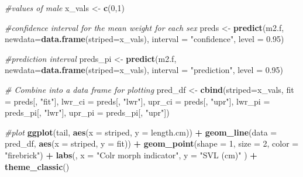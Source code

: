 \documentclass[
]{book}
\newenvironment{Shaded}{\begin{snugshade}}{\end{snugshade}}
\newcommand{\AttributeTok}[1]{\textcolor[rgb]{0.13,0.29,0.53}{#1}}
\newcommand{\CommentTok}[1]{\textcolor[rgb]{0.56,0.35,0.01}{\textit{#1}}}
\newcommand{\DecValTok}[1]{\textcolor[rgb]{0.00,0.00,0.81}{#1}}
\newcommand{\FloatTok}[1]{\textcolor[rgb]{0.00,0.00,0.81}{#1}}
\newcommand{\FunctionTok}[1]{\textcolor[rgb]{0.13,0.29,0.53}{\textbf{#1}}}
\newcommand{\NormalTok}[1]{#1}
\newcommand{\OtherTok}[1]{\textcolor[rgb]{0.56,0.35,0.01}{#1}}
\newcommand{\SpecialCharTok}[1]{\textcolor[rgb]{0.81,0.36,0.00}{\textbf{#1}}}
\newcommand{\StringTok}[1]{\textcolor[rgb]{0.31,0.60,0.02}{#1}}
\begin{document}
\begin{Shaded}
\begin{Highlighting}[]
\CommentTok{\#values of male}
\NormalTok{x\_vals }\OtherTok{\textless{}{-}} \FunctionTok{c}\NormalTok{(}\DecValTok{0}\NormalTok{,}\DecValTok{1}\NormalTok{)}

\CommentTok{\#confidence interval for the mean weight for each sex}
\NormalTok{preds }\OtherTok{\textless{}{-}} \FunctionTok{predict}\NormalTok{(m2.f, }\AttributeTok{newdata=}\FunctionTok{data.frame}\NormalTok{(}\AttributeTok{striped=}\NormalTok{x\_vals), }
                 \AttributeTok{interval =} \StringTok{"confidence"}\NormalTok{, }\AttributeTok{level =} \FloatTok{0.95}\NormalTok{)}

\CommentTok{\#prediction interval}
\NormalTok{preds\_pi }\OtherTok{\textless{}{-}} \FunctionTok{predict}\NormalTok{(m2.f, }\AttributeTok{newdata=}\FunctionTok{data.frame}\NormalTok{(}\AttributeTok{striped=}\NormalTok{x\_vals), }
                    \AttributeTok{interval =} \StringTok{"prediction"}\NormalTok{, }\AttributeTok{level =} \FloatTok{0.95}\NormalTok{)}

\CommentTok{\# Combine into a data frame for plotting}
\NormalTok{pred\_df }\OtherTok{\textless{}{-}} \FunctionTok{cbind}\NormalTok{(}\AttributeTok{striped=}\NormalTok{x\_vals,}
                 \AttributeTok{fit =}\NormalTok{ preds[, }\StringTok{"fit"}\NormalTok{],}
                 \AttributeTok{lwr\_ci =}\NormalTok{ preds[, }\StringTok{"lwr"}\NormalTok{],}
                 \AttributeTok{upr\_ci =}\NormalTok{ preds[, }\StringTok{"upr"}\NormalTok{],}
                 \AttributeTok{lwr\_pi =}\NormalTok{ preds\_pi[, }\StringTok{"lwr"}\NormalTok{],}
                 \AttributeTok{upr\_pi =}\NormalTok{ preds\_pi[, }\StringTok{"upr"}\NormalTok{])}

\CommentTok{\#plot}
\FunctionTok{ggplot}\NormalTok{(tail, }\FunctionTok{aes}\NormalTok{(}\AttributeTok{x =}\NormalTok{ striped, }\AttributeTok{y =}\NormalTok{ length.cm)) }\SpecialCharTok{+}
  \FunctionTok{geom\_line}\NormalTok{(}\AttributeTok{data =}\NormalTok{ pred\_df, }
              \FunctionTok{aes}\NormalTok{(}\AttributeTok{x =}\NormalTok{ striped, }\AttributeTok{y =}\NormalTok{ fit)) }\SpecialCharTok{+}
  \FunctionTok{geom\_point}\NormalTok{(}\AttributeTok{shape =} \DecValTok{1}\NormalTok{, }\AttributeTok{size =} \DecValTok{2}\NormalTok{, }\AttributeTok{color =} \StringTok{"firebrick"}\NormalTok{) }\SpecialCharTok{+}
  \FunctionTok{labs}\NormalTok{(,}
    \AttributeTok{x =} \StringTok{"Colr morph indicator"}\NormalTok{,}
    \AttributeTok{y =} \StringTok{"SVL (cm)"}
\NormalTok{  ) }\SpecialCharTok{+}
  \FunctionTok{theme\_classic}\NormalTok{()}
\end{Highlighting}
\end{Shaded}
\end{document}
